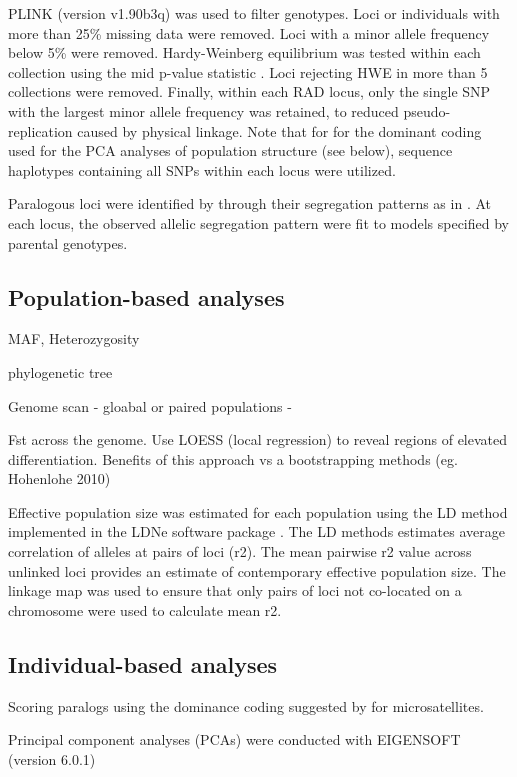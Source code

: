 \documentclass[12pt, one column]{article}
\begin{document}
PLINK (version v1.90b3q) \citep{Chang2014} was used to filter genotypes.  Loci or individuals with more than 25\% missing data were removed.  Loci with a minor allele frequency below 5\% were removed. Hardy-Weinberg equilibrium was tested within each collection using the mid p-value statistic \citep{Graffelman2013}. Loci rejecting HWE in more than 5 collections were removed.  Finally, within each RAD locus, only the single SNP with the largest minor allele frequency was retained, to reduced pseudo-replication caused by physical linkage.  Note that for for the dominant coding used for the PCA analyses of population structure (see below), sequence haplotypes containing all SNPs within each locus were utilized.

Paralogous loci were identified by through their segregation patterns as in \citet{Waples2015}.  At each locus, the observed allelic segregation pattern were fit to models specified by parental genotypes.

\subsection*{Population-based analyses} 

MAF, Heterozygosity

phylogenetic tree

Genome scan - gloabal or paired populations - 	

Fst across the genome.  Use LOESS (local regression) to reveal regions of elevated differentiation.  Benefits of this approach vs a bootstrapping methods (eg. Hohenlohe 2010)

Effective population size was estimated for each population using the LD method implemented in the LDNe software package \citep{Waples2010}.  The LD methods estimates average correlation of alleles at pairs of loci (r2). The mean pairwise r2 value across unlinked loci provides an estimate of contemporary effective population size. The linkage map was used to ensure that only pairs of loci not co-located on a chromosome were used to calculate mean r2.

\subsection*{Individual-based analyses} 
Scoring paralogs using the dominance coding suggested by \citet{Patterson2006} for microsatellites. 

Principal component analyses (PCAs) were conducted with EIGENSOFT (version 6.0.1) \citep{Patterson2006}
\end{document}
